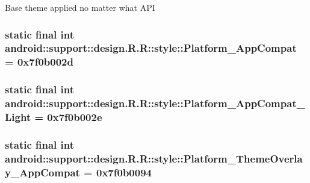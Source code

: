Base theme applied no matter what API \hypertarget{classandroid_1_1support_1_1design_1_1_r_1_1style_4d38fc20ee3a363e437a08cc50eb92f6}{
\subsubsection[{Platform\_\-AppCompat}]{\setlength{\rightskip}{0pt plus 5cm}static final int android::support::design.R.R::style::Platform\_\-AppCompat = 0x7f0b002d}}
\label{classandroid_1_1support_1_1design_1_1_r_1_1style_4d38fc20ee3a363e437a08cc50eb92f6}


\hypertarget{classandroid_1_1support_1_1design_1_1_r_1_1style_4495200618f0204a2173b251e7310515}{
\subsubsection[{Platform\_\-AppCompat\_\-Light}]{\setlength{\rightskip}{0pt plus 5cm}static final int android::support::design.R.R::style::Platform\_\-AppCompat\_\-Light = 0x7f0b002e}}
\label{classandroid_1_1support_1_1design_1_1_r_1_1style_4495200618f0204a2173b251e7310515}


\hypertarget{classandroid_1_1support_1_1design_1_1_r_1_1style_a3f72c543fe0016084a3bb9efde38499}{
\subsubsection[{Platform\_\-ThemeOverlay\_\-AppCompat}]{\setlength{\rightskip}{0pt plus 5cm}static final int android::support::design.R.R::style::Platform\_\-ThemeOverlay\_\-AppCompat = 0x7f0b0094}}
\label{classandroid_1_1support_1_1design_1_1_r_1_1style_a3f72c543fe0016084a3bb9efde38499}


